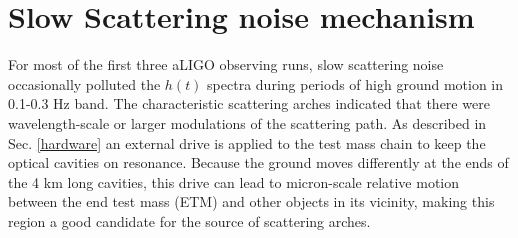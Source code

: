 \documentclass[12pt]{iopart}
\begin{document}
\section{Slow Scattering noise mechanism}\label{m0r0_scattering}
For most of the first three aLIGO observing runs, slow scattering noise occasionally polluted the $h(t)$ spectra during periods of high ground motion in 0.1-0.3 Hz band. The characteristic scattering arches indicated that there were wavelength-scale or larger modulations of the scattering path.
As described in Sec. \ref{hardware} an external drive is applied to the test mass chain to keep the optical cavities on resonance. Because the ground moves differently at the ends of the 4 km long cavities, this drive can lead to micron-scale relative motion between the end test mass (ETM) and other objects in its vicinity, making this region a good candidate for the source of scattering arches.
\end{document}
